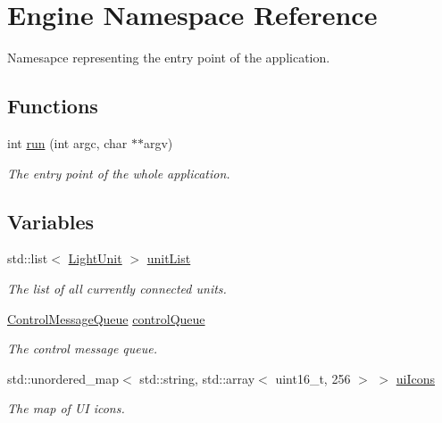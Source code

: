 \hypertarget{namespaceEngine}{}\section{Engine Namespace Reference}
\label{namespaceEngine}


Namesapce representing the entry point of the application.  


\subsection*{Functions}
\begin{DoxyCompactItemize}
\item 
int \mbox{\hyperlink{namespaceEngine_a18825e7d28c8436bb36f3ca02b99d41f}{run}} (int argc, char $\ast$$\ast$argv)
\begin{DoxyCompactList}\small\item\em The entry point of the whole application. \end{DoxyCompactList}\end{DoxyCompactItemize}
\subsection*{Variables}
\begin{DoxyCompactItemize}
\item 
\mbox{\label{namespaceEngine_ac3baaa2258cdfbc45de266c5b5641454}} 
std\+::list$<$ \mbox{\hyperlink{classLightUnit}{Light\+Unit}} $>$ \mbox{\hyperlink{namespaceEngine_ac3baaa2258cdfbc45de266c5b5641454}{unit\+List}}
\begin{DoxyCompactList}\small\item\em The list of all currently connected units. \end{DoxyCompactList}\item 
\mbox{\label{namespaceEngine_a300dfed93e6ea0213f64e184373517ed}} 
\mbox{\hyperlink{classControlMessageQueue}{Control\+Message\+Queue}} \mbox{\hyperlink{namespaceEngine_a300dfed93e6ea0213f64e184373517ed}{control\+Queue}}
\begin{DoxyCompactList}\small\item\em The control message queue. \end{DoxyCompactList}\item 
\mbox{\label{namespaceEngine_ae562ecbc72c843b594695a058487d3cb}} 
std\+::unordered\+\_\+map$<$ std\+::string, std\+::array$<$ uint16\+\_\+t, 256 $>$ $>$ \mbox{\hyperlink{namespaceEngine_ae562ecbc72c843b594695a058487d3cb}{ui\+Icons}}
\begin{DoxyCompactList}\small\item\em The map of UI icons. \end{DoxyCompactList}\end{DoxyCompactItemize}


